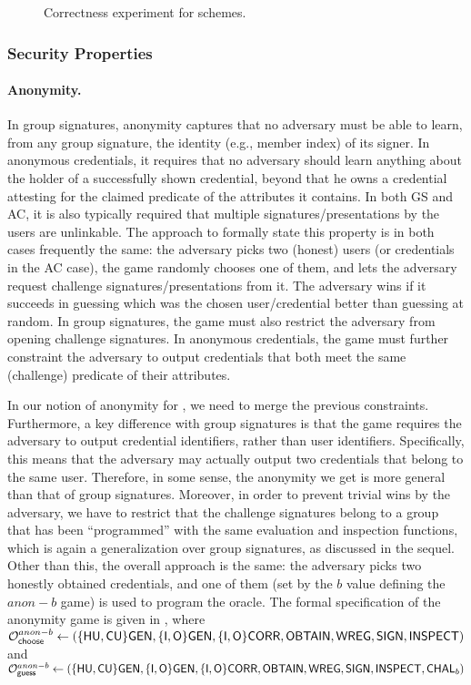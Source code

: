 \begin{figure}[htp!]
  \caption{Correctness experiment for \UAS schemes.}
  \label{fig:exp-uas-corr}
\end{figure}

\subsubsection{Security Properties}
\label{sssec:security}

\paragraph{Anonymity.} %
In group signatures, anonymity captures that no adversary must be able to learn,
from any group signature, the identity (e.g., member index) of its signer. In 
anonymous credentials, it requires that no adversary should learn anything about
the holder of a successfully shown credential, beyond that he owns a credential
attesting for the claimed predicate of the attributes it contains. In both GS
and AC, it is also typically required that
multiple signatures/presentations by the users are unlinkable. The approach to
formally state this property is in both cases frequently the same: the adversary
picks two (honest) users (or credentials in the AC case), the game randomly
chooses one of them, and lets the adversary request challenge
signatures/presentations from it. The adversary wins if it succeeds in guessing
which was the chosen user/credential better than guessing at random. In group
signatures, the game must also restrict the adversary from opening challenge
signatures. In anonymous credentials, the game must further constraint the
adversary to output credentials that both meet the same (challenge) predicate
of their attributes.

In our notion of anonymity for \UAS, we need to merge the previous constraints.
Furthermore, a key difference with group signatures is that the game requires
the adversary to output credential identifiers, rather than user identifiers.
Specifically, this means that the adversary may actually output two credentials
that belong to the same user. Therefore, in some sense, the anonymity we get is
more general than that of group signatures. Moreover, in order to prevent
trivial wins by the adversary, we have to restrict that the challenge signatures
belong to a group that has been ``programmed'' with the same evaluation and
inspection functions, which is again a generalization over group signatures,
as discussed in the sequel. Other than this, the overall approach is the same:
the adversary picks two honestly obtained credentials, and one of them (set
by the $b$ value defining the $anon-b$ game) is used to program the \CHALb
oracle. The formal specification of the anonymity game is
given in , where $\mathcal{O}^{anon-b}_{\mathsf{choose}} \gets (\lbrace\mathsf{HU},\mathsf{CU}\rbrace
\mathsf{GEN},\lbrace\mathsf{I},\mathsf{O}\rbrace\mathsf{GEN},\lbrace\mathsf{I},\mathsf{O}\rbrace\mathsf{CORR},\mathsf{OBTAIN},\mathsf{WREG},\mathsf{SIGN},
\mathsf{INSPECT})$ and $\mathcal{O}^{anon-b}_{\mathsf{guess}} \gets (\lbrace\mathsf{HU},\mathsf{CU}\rbrace\mathsf{GEN},\lbrace\mathsf{I},\mathsf{O}\rbrace
\mathsf{GEN},\lbrace\mathsf{I},\mathsf{O}\rbrace\mathsf{CORR},\mathsf{OBTAIN},\mathsf{WREG},\mathsf{SIGN},\mathsf{INSPECT},\mathsf{CHAL}_b)$

